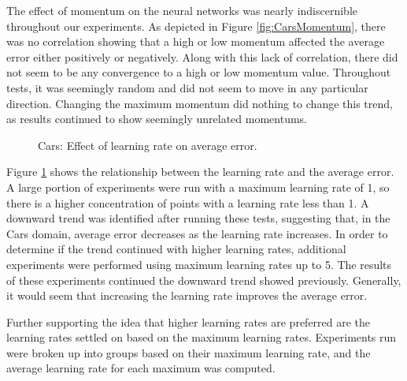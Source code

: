 \documentclass[10pt, conference, compsocconf]{IEEEtran}
\begin{document}
The effect of momentum on the neural networks was nearly indiscernible throughout our experiments. As depicted in Figure \ref{fig:CarsMomentum}, there was no correlation showing that a high or low momentum affected the average error either positively or negatively. Along with this lack of correlation, there did not seem to be any convergence to a high or low momentum value. Throughout tests, it was seemingly random and did not seem to move in any particular direction. Changing the maximum momentum did nothing to change this trend, as results continued to show seemingly unrelated momentums.

\begin{figure}
\begin{center}
\end{center}
\caption{Cars: Effect of learning rate on average error.}
\label{fig:CarsLearningRate}
\end{figure}

Figure \ref{fig:CarsLearningRate} shows the relationship between the learning rate and the average error. A large portion of experiments were run with a maximum learning rate of 1, so there is a higher concentration of points with a learning rate less than 1. A downward trend was identified after running these tests, suggesting that, in the Cars domain, average error decreases as the learning rate increases. In order to determine if the trend continued with higher learning rates, additional experiments were performed using maximum learning rates up to 5. The results of these experiments continued the downward trend showed previously. Generally, it would seem that increasing the learning rate improves the average error.

Further supporting the idea that higher learning rates are preferred are the learning rates settled on based on the maximum learning rates. Experiments run were broken up into groups based on their maximum learning rate, and the average learning rate for each maximum was computed.
\end{document}
